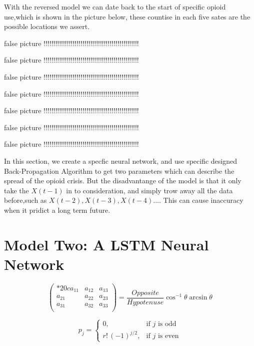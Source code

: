 \documentclass{mcmthesis}
\begin{document}
	\par With the reversed model we can date back to the start of specific opioid use,which is shown in the picture below, these countise in each five sates are the possible locations we assert.
	\par false picture !!!!!!!!!!!!!!!!!!!!!!!!!!!!!!!!!!!!!!!!!!!!!!!!!
	\par false picture !!!!!!!!!!!!!!!!!!!!!!!!!!!!!!!!!!!!!!!!!!!!!!!!!
	\par false picture !!!!!!!!!!!!!!!!!!!!!!!!!!!!!!!!!!!!!!!!!!!!!!!!!
	\par false picture !!!!!!!!!!!!!!!!!!!!!!!!!!!!!!!!!!!!!!!!!!!!!!!!!
	\par false picture !!!!!!!!!!!!!!!!!!!!!!!!!!!!!!!!!!!!!!!!!!!!!!!!!
	\par false picture !!!!!!!!!!!!!!!!!!!!!!!!!!!!!!!!!!!!!!!!!!!!!!!!!
	\par false picture !!!!!!!!!!!!!!!!!!!!!!!!!!!!!!!!!!!!!!!!!!!!!!!!!
	
	\par In this section, we create a specfic neural network, and use specific designed Back-Propagation Algorithm to get two parameters which can describe the spread of the opioid crisis. But the disadvantange of the model is that it only take the $X(t-1)$ in to consideration, and simply trow away all the data before,such as $X(t-2), X(t-3),X(t-4)...$. This can cause inaccuracy when it pridict a long term future.
	
	
\section{Model Two: A LSTM Neural Network}
	

\[
  \begin{pmatrix}{*{20}c}
  {a_{11} } & {a_{12} } & {a_{13} }  \\
  {a_{21} } & {a_{22} } & {a_{23} }  \\
  {a_{31} } & {a_{32} } & {a_{33} }  \\
  \end{pmatrix}
  = \frac{{Opposite}}{{Hypotenuse}}\cos ^{ - 1} \theta \arcsin \theta
\]
\lipsum[9]

\[
  p_{j}=\begin{cases} 0,&\text{if $j$ is odd}\\
  r!\,(-1)^{j/2},&\text{if $j$ is even}
  \end{cases}
\]
\end{document}
